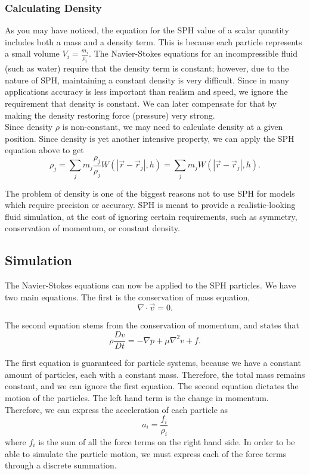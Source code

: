 \documentclass[a4paper]{article}
\begin{document}
\subsubsection{Calculating Density}
As you may have noticed, the equation for the SPH value of a scalar quantity includes both a mass and a density term. This is because each particle represents a small volume $V_i = \frac{m_i}{\rho_i}$. The Navier-Stokes equations for an incompressible fluid (such as water) require that the density term is constant; however, due to the nature of SPH, maintaining a constant density is very difficult. Since in many applications accuracy is less important than realism and speed, we ignore the requirement that density is constant. We can later compensate for that by making the density restoring force (pressure) very strong. \\


Since density $\rho$ is non-constant, we may need to calculate density at a given position. Since density is yet another intensive property, we can apply the SPH equation above to get
\[\rho_j = \sum_j m_j \frac{\rho_j}{\rho_j} W(|\vec r - \vec r_j|, h) = \sum_j m_j W(|\vec r - \vec r_j|, h).\]

The problem of density is one of the biggest reasons not to use SPH for models which require precision or accuracy. SPH is meant to provide a realistic-looking fluid simulation, at the cost of ignoring certain requirements, such as symmetry, conservation of momentum, or constant density.

\subsection{Simulation}
The Navier-Stokes equations can now be applied to the SPH particles. We have two main equations. The first is the conservation of mass equation, 
\[\nabla\cdot\vec v = 0.\]


The second equation stems from the conservation of momentum, and states that 
\[\rho\frac{Dv}{Dt} = -\nabla p + \mu \nabla^2 v + f.\]

The first equation is guaranteed for particle systems, because we have a constant amount of particles, each with a constant mass. Therefore, the total mass remains constant, and we can ignore the first equation. The second equation dictates the motion of the particles. The left hand term is the change in momentum. Therefore, we can express the acceleration of each particle as
\[a_i = \frac{f_i}{\rho_i}\]
where $f_i$ is the sum of all the force terms on the right hand side. In order to be able to simulate the particle motion, we must express each of the force terms through a discrete summation.
\end{document}
